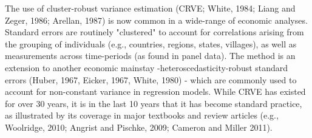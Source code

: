 \documentclass[12pt]{article}
\begin{document}

The use of cluster-robust variance estimation (CRVE; White, 1984; Liang and Zeger, 1986; Arellan, 1987) is now common in a wide-range of economic analyses.
Standard errors are routinely "clustered" to account for correlations arising from the grouping of individuals (e.g., countries, regions, states, villages), as well as measurements across time-periods (as found in panel data). 
The method is an extension to another economic mainstay -heteroscedasticity-robust standard errors (Huber, 1967, Eicker, 1967, White, 1980) - which are commonly used to account for non-constant variance in regression models. 
While CRVE has existed for over 30 years, it is in the last 10 years that it has become standard practice, as illustrated by its coverage in major textbooks and review articles (e.g., Woolridge, 2010; Angrist and Pischke, 2009; Cameron and Miller 2011).
\end{document}
